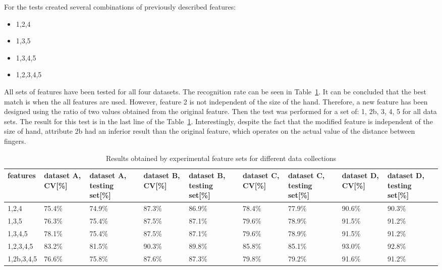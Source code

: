 For the tests created several combinations of previously described features:
\begin{itemize}
\item 1,2,4
\item 1,3,5
\item 1,3,4,5
\item 1,2,3,4,5
\end{itemize}

All sets of features have been tested for all four datasets. The recognition rate can be seen in Table~\ref{findiff}. It can be concluded that the best match is when the all features are used. However, feature 2 is not independent of the size of the hand. Therefore, a new feature has been designed using the ratio of two values obtained from the original feature. Then the test was performed for a set of: 1, 2b, 3, 4, 5 for all data sets. The result for this test is in the last line of the Table~\ref{findiff}. Interestingly, despite the fact that the modified feature is independent of the size of hand, attribute 2b had an inferior result than the original feature, which operates on the actual value of the distance between fingers. 

\begin{table}[htp!]
\begin{center}
	\label{findiff}
	\caption{Results obtained by experimental feature sets for different data collections}
    \begin{tabular}{|p{1.3cm}|p{1.3cm}|p{1.3cm}|p{1.3cm}|p{1.3cm}|p{1.3cm}|p{1.3cm}|p{1.3cm}|p{1.3cm}|}
    \hline
    features & dataset A, CV[\%] & dataset A, testing set[\%] & dataset B, CV[\%] & dataset B, testing set[\%] & dataset C, CV[\%]& dataset C, testing set[\%]  & dataset D, CV[\%] & dataset D, testing set[\%]  \\ \hline
    1,2,4	& 75.4\% & 74.9\% & 87.3\%  & 86.9\% & 78.4\% & 77.9\% & 90.6\% & 90.3\% \\ \hline
    1,3,5     	& 76.3\% & 75.4\% & 87.5\%  & 87.1\% & 79.6\% & 78.9\% & 91.5\% & 91.2\% \\ \hline
    1,3,4,5    	& 78.1\% & 75.4\% & 87.5\%  & 87.1\% & 79.6\% & 78.9\% & 91.5\% & 91.2\% \\ \hline
    1,2,3,4,5   & 83.2\% & 81.5\% & 90.3\%  & 89.8\% & 85.8\% & 85.1\% & 93.0\% & 92.8\% \\ \hline
    1,2b,3,4,5	& 76.6\% & 75.8\% & 87.6\%  & 87.3\% & 79.8\% & 79.2\% & 91.6\% & 91.2\% \\ \hline
    \end{tabular}
    \end{center}
\end{table}

